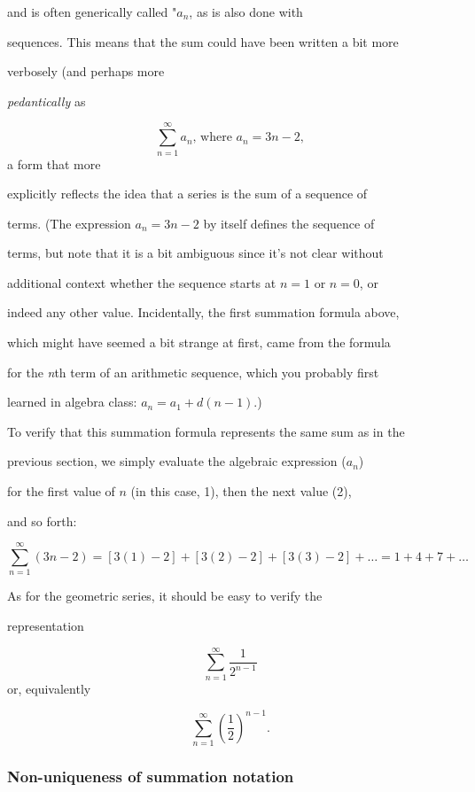 and is often generically called "$a_n$, as is also done with

sequences. This means that the sum could have been written a bit more

verbosely (and perhaps more

\textit{pedantically} as


\[
\sum _{n=1}^{\infty} a_n \text{, where } a_n=3n-2,
\] a form that more

explicitly reflects the idea that a series is the sum of a sequence of

terms. (The expression $a_n=3n-2$ by itself defines the sequence of

terms, but note that it is a bit ambiguous since it's not clear without

additional context whether the sequence starts at $n=1$ or $n=0$, or

indeed any other value. Incidentally, the first summation formula above,

which might have seemed a bit strange at first, came from the formula

for the \textit{n}th term of an arithmetic sequence, which you probably first

learned in algebra class: $a_n=a_1+d(n-1)$.)


To verify that this summation formula represents the same sum as in the

previous section, we simply evaluate the algebraic expression ($a_n$)

for the first value of $n$ (in this case, 1), then the next value (2),

and so forth:


\[
\sum _{n=1}^{\infty} (3n-2) = [3(1)-2]+[3(2)-2]+[3(3)-2]+\ldots = 1+4+7+\ldots
\]


As for the geometric series, it should be easy to verify the

representation


\[
\sum _{n=1}^{\infty} \frac{1}{2^{n-1}}
\] or, equivalently


\[
\sum _{n=1}^{\infty} \left(\frac{1}{2}\right)^{n-1}.
\]


\subsubsection{Non-uniqueness of summation notation}
\label{sss:nonu-9309}


